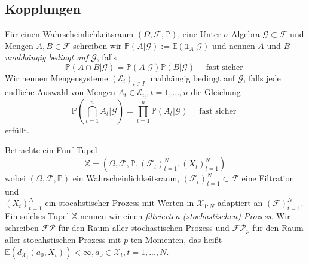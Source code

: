 \subsection{Kopplungen}
\begin{definition}
    Für einen Wahrscheinlichkeitsraum $(\Omega, \mathcal{F}, \mathbb{P})$, eine Unter $\sigma$-Algebra $\mathcal{G} \subset \mathcal{F}$ und Mengen $A, B \in \mathcal{F}$ schreiben wir $\mathbb{P}(A \vert \mathcal{G}) := \mathbb{E}(\mathds{1}_A\vert \mathcal{G})$ und nennen $A$ und $B$ \emph{unabhängig bedingt auf $\mathcal{G}$}, falls
    \begin{equation}\label{eq:def_cond_ind}
    \mathbb{P}(A\cap B\vert \mathcal{G}) = \mathbb{P}(A\vert \mathcal{G}) \mathbb{P}(B \vert \mathcal{G}) \quad \text{ fast sicher }
    \end{equation}
    Wir nennen Mengensysteme $(\mathcal{E}_i)_{i\in I}$ unabhängig bedingt auf $\mathcal{G}$, falls jede endliche Auswahl von Mengen $A_t \in \mathcal{E}_{i_t}, t=1,...,n$ die Gleichung
    $$\mathbb{P}\left(\bigcap_{t=1}^n A_t\vert \mathcal{G}\right) = \prod_{t=1}^n \mathbb{P}(A_t \vert \mathcal{G}) \quad \text{ fast sicher }$$
    erfüllt.
\end{definition}
\begin{definition}
Betrachte ein Fünf-Tupel
$$\mathbb{X}=\left(\Omega, \mathcal{F}, \mathbb{P}, \left(\mathcal{F}_t\right)_{t=1}^N, \left(X_t\right)_{t=1}^N\right)$$
wobei $(\Omega, \mathcal{F}, \mathbb{P})$ ein Wahrscheinlichkeitsraum, $\left(\mathcal{F}_t\right)_{t=1}^N\subset \mathcal{F}$ eine Filtration und \\
$(X_t)_{t=1}^N$ ein stocahstischer Prozess mit Werten in $\mathcal{X}_{1:N}$ adaptiert an $(\mathcal{F})_{t=1}^N$. Ein solches Tupel $\mathbb{X}$ nennen wir einen \emph{filtrierten (stochastischen) Prozess}. Wir schreiben $\mathcal{FP}$ für den Raum aller stochastischen Prozess und $\mathcal{FP}_p$ für den Raum aller stocahstischen Prozess mit $p$-ten Momenten, das heißt $\mathbb{E}(d_{\mathcal{X}_t}(a_0, X_t))<\infty, a_0\in\mathcal{X}_t, t=1,...,N$.
\end{definition}
